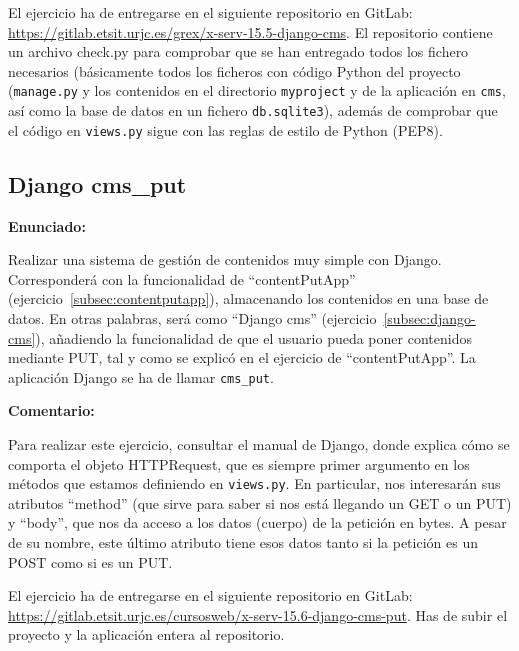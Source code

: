 El ejercicio ha de entregarse en el siguiente repositorio en GitLab: 
\url{https://gitlab.etsit.urjc.es/grex/x-serv-15.5-django-cms}. El repositorio contiene
un archivo check.py para comprobar que se han entregado todos los fichero necesarios (básicamente todos los ficheros con código Python del proyecto (\texttt{manage.py} y los contenidos en el directorio \texttt{myproject} y de la aplicación en \texttt{cms}, así como la base de datos en un fichero \texttt{db.sqlite3}), además de comprobar que el código en
\texttt{views.py} sigue con las reglas de estilo de Python (PEP8).

%


\subsection{Django cms\_put}
\label{subsec:django-cms-put}

\textbf{Enunciado:}

Realizar una sistema de gestión de contenidos muy simple con Django. Corresponderá con la funcionalidad de ``contentPutApp'' (ejercicio~\ref{subsec:contentputapp}), almacenando los contenidos en una base de datos. En otras palabras, será como ``Django cms'' (ejercicio~\ref{subsec:django-cms}), añadiendo la funcionalidad de que el usuario pueda poner contenidos mediante PUT, tal y como se explicó en el ejercicio de ``contentPutApp''. La aplicación Django se ha de llamar \texttt{cms\_put}.


\textbf{Comentario:}

Para realizar este ejercicio, consultar el manual de Django, donde explica cómo se comporta el objeto HTTPRequest, que es siempre primer argumento en los métodos que estamos definiendo en \texttt{views.py}. En particular, nos interesarán sus atributos ``method'' (que sirve para saber si nos está llegando un GET o un PUT) y ``body'', que nos da acceso a los datos (cuerpo) de la petición en bytes. A pesar de su nombre, este último atributo tiene esos datos tanto si la petición es un POST como si es un PUT. 

El ejercicio ha de entregarse en el siguiente repositorio en GitLab: 
\url{https://gitlab.etsit.urjc.es/cursosweb/x-serv-15.6-django-cms-put}. Has de subir el proyecto y la aplicación entera al repositorio.

